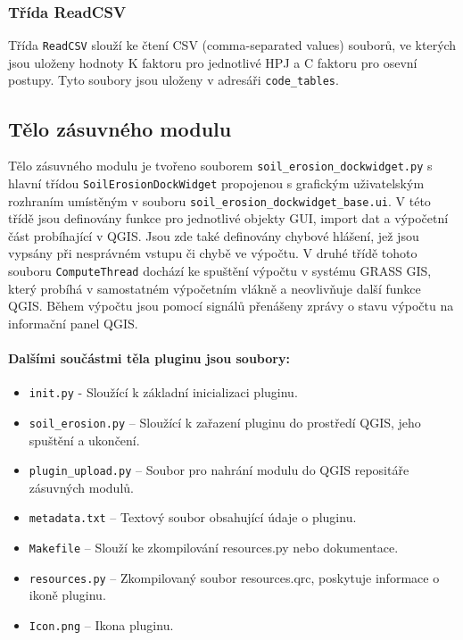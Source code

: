 \subsubsection{Třída ReadCSV} Třída \texttt{ReadCSV} slouží ke čtení
CSV (comma-separated values) souborů, ve kterých jsou uloženy hodnoty
K faktoru pro jednotlivé HPJ a C faktoru pro osevní postupy. Tyto
soubory jsou uloženy v adresáři \texttt{code\_tables}.

\subsection{Tělo zásuvného modulu} Tělo zásuvného modulu je tvořeno
souborem \texttt{soil\_erosion\_dockwidget.py} s hlavní třídou
\texttt{SoilErosionDockWidget} propojenou s grafickým uživatelským
rozhraním umístěným v souboru
\texttt{soil\_erosion\_dockwidget\_base.ui}. V této třídě jsou
definovány funkce pro jednotlivé objekty GUI, import dat a výpočetní
část probíhající v QGIS. Jsou zde také definovány chybové hlášení, jež
jsou vypsány při nesprávném vstupu či chybě ve výpočtu. V druhé třídě
tohoto souboru \texttt{ComputeThread} dochází ke spuštění výpočtu v
systému GRASS GIS, který probíhá v samostatném výpočetním vlákně a
neovlivňuje další funkce QGIS. Během výpočtu jsou pomocí signálů
přenášeny zprávy o stavu výpočtu na informační panel QGIS.

\paragraph{Dalšími součástmi těla pluginu jsou soubory:}
\begin{itemize}
	\item \texttt{init.py} - Sloužící k základní inicializaci
pluginu.
	\item \texttt{soil\_erosion.py} – Sloužící k zařazení pluginu
do prostředí QGIS, jeho spuštění a ukončení.
	\item \texttt{plugin\_upload.py} – Soubor pro nahrání modulu
do QGIS repositáře zásuvných modulů.
	\item \texttt{metadata.txt} – Textový soubor obsahující údaje
o pluginu.
	\item \texttt{Makefile} – Slouží ke zkompilování resources.py
nebo dokumentace.
	\item \texttt{resources.py} – Zkompilovaný soubor
resources.qrc, poskytuje informace o ikoně pluginu.
	\item \texttt{Icon.png} – Ikona pluginu.
\end{itemize}
\newpage
